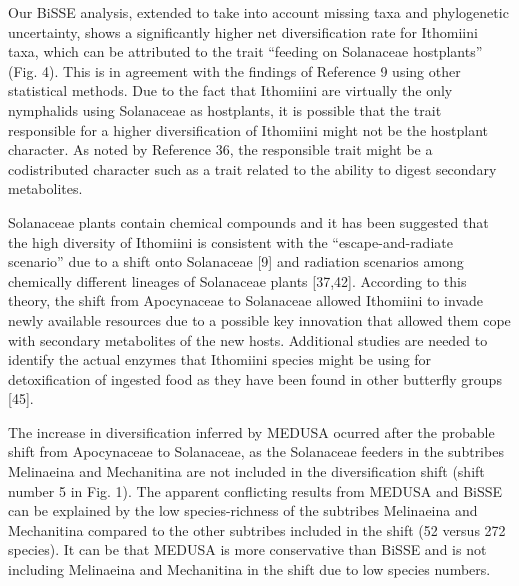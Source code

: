 \documentclass[10pt]{article}
\begin{document}
Our BiSSE analysis, extended to take into account missing taxa and
phylogenetic uncertainty, shows a significantly higher net
diversification rate for Ithomiini taxa, which can be attributed to the
trait ``feeding on Solanaceae hostplants'' (Fig. 4). This is in
agreement with the findings of Reference 9 using other statistical
methods. Due to the fact that Ithomiini are virtually the only
nymphalids using Solanaceae as hostplants, it is possible that the trait
responsible for a higher diversification of Ithomiini might not be the
hostplant character. As noted by Reference 36, the responsible trait
might be a codistributed character such as a trait related to the
ability to digest secondary metabolites.

Solanaceae plants contain chemical compounds and it has been suggested
that the high diversity of Ithomiini is consistent with the
``escape-and-radiate scenario'' due to a shift onto Solanaceae {[}9{]}
and radiation scenarios among chemically different lineages of
Solanaceae plants {[}37,42{]}. According to this theory, the shift from
Apocynaceae to Solanaceae allowed Ithomiini to invade newly available
resources due to a possible key innovation that allowed them cope with
secondary metabolites of the new hosts. Additional studies are needed to
identify the actual enzymes that Ithomiini species might be using for
detoxification of ingested food as they have been found in other
butterfly groups {[}45{]}.

The increase in diversification inferred by MEDUSA ocurred after the
probable shift from Apocynaceae to Solanaceae, as the Solanaceae feeders
in the subtribes Melinaeina and Mechanitina are not included in the
diversification shift (shift number 5 in Fig. 1). The apparent
conflicting results from MEDUSA and BiSSE can be explained by the low
species-richness of the subtribes Melinaeina and Mechanitina compared to
the other subtribes included in the shift (52 versus 272 species). It
can be that MEDUSA is more conservative than BiSSE and is not including
Melinaeina and Mechanitina in the shift due to low species numbers.
\end{document}
